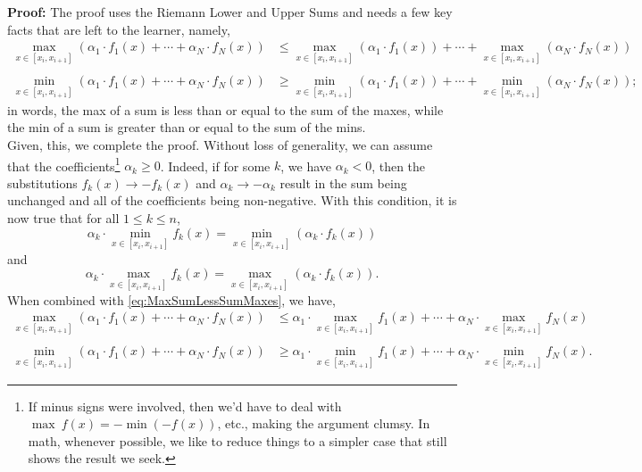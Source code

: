 \textbf{Proof:} The proof uses the Riemann Lower and Upper Sums and needs a few key facts that are left to the learner, namely,
\begin{equation}
\label{eq:MaxSumLessSumMaxes}
\begin{aligned}
     \max_{x \in [x_i, x_{i+1}]} \left( \alpha_1 \cdot f_1(x) +  \cdots + \alpha_N \cdot f_N(x)  \right) &\le  \max_{x \in [x_i, x_{i+1}]} \left(\alpha_1 \cdot f_1(x) \right) +  \cdots + \max_{x \in [x_i, x_{i+1}]} \left( \alpha_N \cdot f_N(x) \right)\\
     \\
          \min_{x \in [x_i, x_{i+1}]} \left( \alpha_1 \cdot f_1(x) +  \cdots + \alpha_N \cdot f_N(x)  \right) &\ge  \min_{x \in [x_i, x_{i+1}]} \left(\alpha_1 \cdot f_1(x) \right) +  \cdots + \min_{x \in [x_i, x_{i+1}]} \left( \alpha_N \cdot f_N(x) \right);
\end{aligned}   
\end{equation}
in words, the max of a sum is less than or equal to the sum of the maxes, while the min of a sum is greater than or equal to the sum of the mins.\\

Given, this, we complete the proof. Without loss of generality, we can assume that the coefficients\footnote{If minus signs were involved, then we'd have to deal with $\max~ f(x) = - \min (-f(x))$, etc., making the argument clumsy. In math, whenever possible, we like to reduce things to a simpler case that still shows the result we seek.} $\alpha_k \ge 0$. Indeed, if for some $k$, we have $\alpha_k<0$, then the substitutions $f_k(x) \to -f_k(x)$ and $\alpha_k \to -\alpha_k$ result in the sum being unchanged and all of the coefficients being non-negative. With this condition, it is now true that for all $1 \le k \le n$,
$$ \alpha_k \cdot  \min_{x \in [x_i, x_{i+1}]} f_k(x) = \min_{x \in [x_i, x_{i+1}]} \left(\alpha_k \cdot f_k(x) \right) $$
and
$$ \alpha_k \cdot  \max_{x \in [x_i, x_{i+1}]} f_k(x) = \max_{x \in [x_i, x_{i+1}]} \left(\alpha_k \cdot f_k(x) \right). $$
When combined with \eqref{eq:MaxSumLessSumMaxes}, we have,
\begin{equation}
\label{eq:MaxSumLessSumMaxesPosCoeff}
\begin{aligned}
     \max_{x \in [x_i, x_{i+1}]} \left( \alpha_1 \cdot f_1(x) +  \cdots + \alpha_N \cdot f_N(x)  \right) &\le \alpha_1 \cdot \max_{x \in [x_i, x_{i+1}]}  f_1(x)  +  \cdots +  \alpha_N \cdot \max_{x \in [x_i, x_{i+1}]}f_N(x) \\
     \\
          \min_{x \in [x_i, x_{i+1}]} \left( \alpha_1 \cdot f_1(x) +  \cdots + \alpha_N \cdot f_N(x)  \right) &\ge  \alpha_1 \cdot \min_{x \in [x_i, x_{i+1}]}  f_1(x) +  \cdots + \alpha_N \cdot  \min_{x \in [x_i, x_{i+1}]} f_N(x).
\end{aligned}   
\end{equation}

